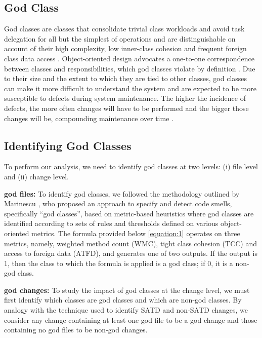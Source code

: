 \subsection{God Class}
God classes are classes that consolidate trivial class workloads and avoid task delegation for all but the simplest of operations and are distinguishable on account of their high complexity, low inner-class cohesion and frequent foreign class data access \cite{lanza2007object}. Object-oriented design advocates a one-to-one correspondence between classes and responsibilities, which god classes violate by definition \cite{lanza2007object}. Due to their size and the extent to which they are tied to other classes, god classes can make it more difficult to understand the system \cite{fowler1999refactoring} and are expected to be more susceptible to defects during system maintenance. The higher the incidence of defects, the more often changes will have to be performed and the bigger those changes will be, compounding maintenance over time \cite{fowler1999refactoring} \cite{lanza2007object}.

\subsection{Identifying God Classes}
\label{ch4_god}

To perform our analysis, we need to identify god classes at two levels: (i) file level and (ii) change level.

\noindent\textbf{god files:} To identify god classes, we followed the methodology outlined by Marinescu \cite{marinescu2004detection}, who proposed an approach to specify and detect
code smells, specifically ``god classes'', based on metric-based heuristics where god classes are identified according to sets of rules and thresholds defined on various object-oriented metrics. The formula provided below \ref{equation:1} operates on three metrics, namely, weighted method count (WMC), tight class cohesion (TCC) and access to foreign data (ATFD), and generates one of two outputs. If the output is 1, then the class to which the formula is applied is a god class; if 0, it is a non-god class.

\noindent\textbf{god changes:}
To study the impact of god classes at the change level, we must first identify which classes are god classes and which are non-god classes. By analogy with the technique used to identify SATD and non-SATD changes, we consider any change containing at least one god file to be a god change and those containing no god files to be non-god changes. 



